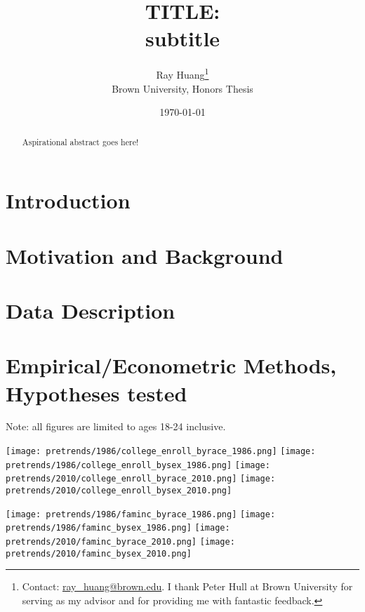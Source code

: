 \documentclass{article}
\title{TITLE:\texorpdfstring{\\}{} subtitle}
\author{Ray Huang\thanks{Contact:
    \href{mailto:ray_huang@brown.edu}{ray\_huang@brown.edu}.
     I thank Peter Hull at Brown University for serving as my advisor and for providing me with fantastic feedback.}
     \\Brown University, Honors Thesis}
\date{\today}
\begin{document}
\maketitle

\begin{abstract}
\noindent Aspirational abstract goes here!
\end{abstract}

\clearpage

\section*{Introduction}

\section*{Motivation and Background}

\section*{Data Description}

\section*{Empirical/Econometric Methods, Hypotheses tested}



\clearpage
\nocite{*}
\singlespacing




\clearpage

Note: all figures are limited to ages 18-24 inclusive.

\begin{center}
  \texttt{[image: pretrends/1986/college\_enroll\_byrace\_1986.png]}
  \texttt{[image: pretrends/1986/college\_enroll\_bysex\_1986.png]}
  \texttt{[image: pretrends/2010/college\_enroll\_byrace\_2010.png]}
  \texttt{[image: pretrends/2010/college\_enroll\_bysex\_2010.png]}
\end{center}

\clearpage

\begin{center}
  \texttt{[image: pretrends/1986/faminc\_byrace\_1986.png]}
  \texttt{[image: pretrends/1986/faminc\_bysex\_1986.png]}
  \texttt{[image: pretrends/2010/faminc\_byrace\_2010.png]}
  \texttt{[image: pretrends/2010/faminc\_bysex\_2010.png]}
\end{center}
\end{document}
